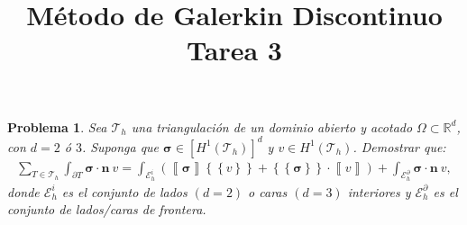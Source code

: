 \documentclass[10pt,a4paper]{report}
\title{\color{azul}\textbf{Método de Galerkin Discontinuo}\\
	\textbf{Tarea 3}}
\author{\color{azul}\autor}
\date{\color{azul}\fecha}
\newtheorem{pro}{Problema}
\newcommand{\bs}{\boldsymbol}
\providecommand{\salto}[1]{\left\llbracket#1\right\rrbracket}
\providecommand{\prom}[1]{\left \{\!\left \{#1\right \}\!\right \}}
\begin{document}
	\begin{pro}
		Sea $\mathscr{T}_{h}$ una triangulación de un dominio abierto y acotado $\Omega\subset \mathbb{R}^{d}$, con $d = 2$ ó $3$. Suponga que $\bs{\sigma}\in \left[ H^{1}\left(\mathscr{T}_{h}\right)\right]^{d}$ y $v\in H^{1}\left(\mathscr{T}_{h}\right)$. Demostrar que:
		\begin{align*}
			\sum_{T\in\mathscr{T}_{h}}\int_{\partial T}\bs{\sigma}\cdot \textbf{n}\ v = \int_{\mathscr{E}^{i}_{h}}\left(\salto{\bs{\sigma}}\prom{v}+\prom{\bs{\sigma}}\cdot \salto{v}\right) + \int_{\mathscr{E}^{\partial}_{h}}\bs{\sigma}\cdot \textbf{n}\ v,
		\end{align*}
	    donde $\mathscr{E}^{i}_{h}$ es el conjunto de lados $(d = 2)$ o caras $(d = 3)$ interiores y $\mathscr{E}^{\partial}_{h}$ es el conjunto de lados/caras de frontera.
	\end{pro}
\end{document}
